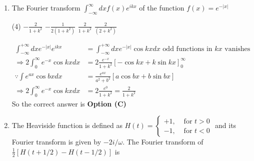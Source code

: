 \begin{enumerate}
	\begin{tasks}(4)
		\task[\textbf{A.}] $\sqrt{2} \pi e^{-\sqrt{2}|| \mid}$
		\task[\textbf{B.}] $\sqrt{2} \pi e^{-\sqrt{2 k}}$
		\task[\textbf{C.}] $\frac{\pi}{\sqrt{2}} e^{-\sqrt{2 k}}$
		\task[\textbf{D.}] $\frac{\pi}{\sqrt{2}} e^{-\sqrt{2}|k|}$
	\end{tasks}
	\begin{answer}
		\begin{align*}
		\text{Fourier transform of }f(x)&=\frac{1}{x^{2}+a^{2}}, \\ a>0\text{ is }\int \frac{1}{x^{2}+a^{2}} e^{i k x} d x&=\frac{\pi}{a} e^{-a|k|}\\
		\text{Hence }\int \frac{1}{x^{2}+a^{2}} e^{i k x} d x&=\frac{\pi}{\sqrt{2}} e^{-\sqrt{2}|k|}
		\end{align*}
		So the correct answer is \textbf{Option (D)}
	\end{answer}
	\item The Fourier transform $\int_{-\infty}^{\infty} d x f(x) e^{i k x}$ of the function $f(x)=e^{-|x|}$
	{}
	
	\begin{tasks}(4)
		\task[\textbf{A.}] $-\frac{2}{1+k^{2}}$
		\task[\textbf{B.}] $-\frac{1}{2\left(1+k^{2}\right)}$
		\task[\textbf{C.}] $\frac{2}{1+k^{2}}$
		\task[\textbf{D.}] $\frac{2}{\left(2+k^{2}\right)}$
	\end{tasks}
\begin{answer}
	\begin{align*}
	\int_{-\infty}^{+\infty} d x e^{-|x|} e^{i k x}&=\int_{-\infty}^{+\infty} d x e^{-|x|} \cos k x d x\text{ odd functions in }k x\text{ vanishes}\\
	\Rightarrow 2 \int_{0}^{\infty} e^{-x} \cos k x d x&=2 \frac{e^{-x}}{1+k^{2}}[-\cos k x+k \sin k x]_{0}^{\infty}\\
	\because \int e^{a x} \cos b x d x&=\frac{e^{a x}}{a^{2}+b^{2}}[a \cos b x+b \sin b x]\\
	\Rightarrow 2 \int_{0}^{\infty} e^{-x} \cos k x d x&=2 \frac{e^{0}}{1+k^{2}}=\frac{2}{1+k^{2}}
	\end{align*}
	So the correct answer is \textbf{Option (C)}
\end{answer}
	\item The Heaviside function is defined as $H(t)=\left\{\begin{array}{ll}+1, & \text { for } t>0 \\ -1, & \text { for } t<0\end{array}\right.$ and its Fourier transform is given by $-2 i / \omega$. The Fourier transform of $\frac{1}{2}[H(t+1 / 2)-H(t-1 / 2)]$ is
	{}
	

\end{enumerate}
